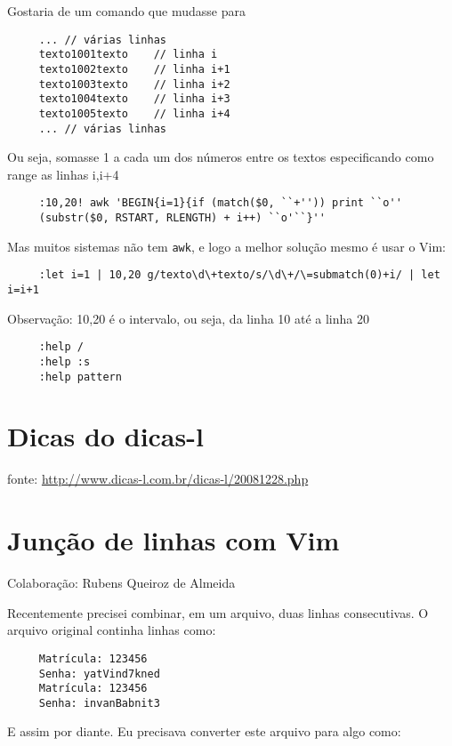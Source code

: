Gostaria de um comando que mudasse para

\begin{verbatim}
     ... // várias linhas
     texto1001texto    // linha i
     texto1002texto    // linha i+1
     texto1003texto    // linha i+2
     texto1004texto    // linha i+3
     texto1005texto    // linha i+4
     ... // várias linhas
\end{verbatim}

Ou seja, somasse 1 a cada um dos números entre os textos
especificando como range as linhas i,i+4

\begin{verbatim}
     :10,20! awk 'BEGIN{i=1}{if (match($0, ``+'')) print ``o''
     (substr($0, RSTART, RLENGTH) + i++) ``o'``}''
\end{verbatim}

Mas muitos sistemas não tem {\tt awk}, e logo a melhor solução mesmo é usar o Vim:

\begin{verbatim}
     :let i=1 | 10,20 g/texto\d\+texto/s/\d\+/\=submatch(0)+i/ | let i=i+1
\end{verbatim}

Observação: 10,20 é o intervalo, ou seja, da linha 10 até a linha 20

\begin{verbatim}
     :help /
     :help :s
     :help pattern
\end{verbatim}

\section{Dicas do dicas-l}

fonte: \url{http://www.dicas-l.com.br/dicas-l/20081228.php}

\section{Junção de linhas com Vim}
\label{Junção de linhas com Vim}
Colaboração: Rubens Queiroz de Almeida

Recentemente precisei combinar, em um arquivo, duas linhas
consecutivas. O arquivo original continha linhas como:

\begin{verbatim}
     Matrícula: 123456
     Senha: yatVind7kned
     Matrícula: 123456
     Senha: invanBabnit3
\end{verbatim}

E assim por diante. Eu precisava converter este arquivo para algo como:

